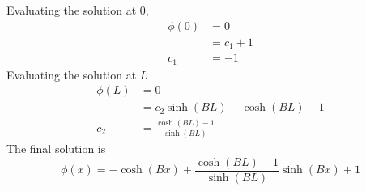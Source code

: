   Evaluating the solution at 0, 
  \begin{align}
    \phi(0) &= 0 \\
    &= c_1 + 1\\
    c_1 &= -1
  \end{align}
  Evaluating the solution at $L$
  \begin{align}
    \phi(L) &= 0\\
    &= c_2 \sinh(BL) - \cosh(BL)-1\\
    c_2 &= \frac{\cosh(BL)-1}{\sinh(BL)}
  \end{align}
  The final solution is 
  \begin{equation} \label{eq:analytic_1dfixedsrc}
    \phi(x) = -\cosh(Bx) + \frac{\cosh(BL)-1}{\sinh(BL)} \sinh(Bx) +1
  \end{equation}
  
